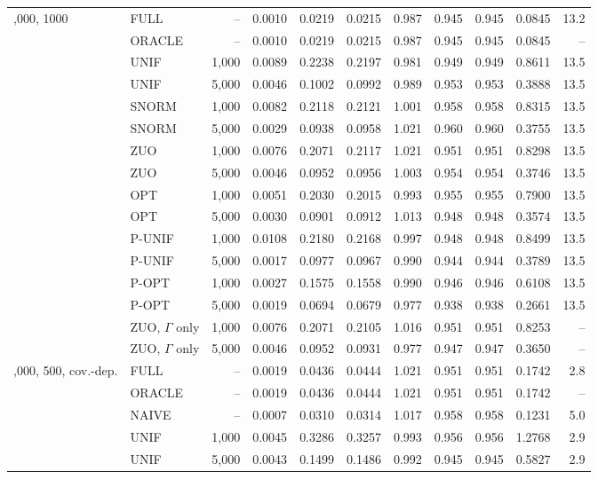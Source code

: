 \begin{tabular}{llrrrrrrrrr}
\addlinespace
200,000, 1000 & FULL & -- & 0.0010 & 0.0219 & 0.0215 & 0.987 & 0.945 & 0.945 & 0.0845 & 13.2\\
 & ORACLE & -- & 0.0010 & 0.0219 & 0.0215 & 0.987 & 0.945 & 0.945 & 0.0845 & --\\
 & UNIF & 1,000 & 0.0089 & 0.2238 & 0.2197 & 0.981 & 0.949 & 0.949 & 0.8611 & 13.5\\
 & UNIF & 5,000 & 0.0046 & 0.1002 & 0.0992 & 0.989 & 0.953 & 0.953 & 0.3888 & 13.5\\
 & SNORM & 1,000 & 0.0082 & 0.2118 & 0.2121 & 1.001 & 0.958 & 0.958 & 0.8315 & 13.5\\
 & SNORM & 5,000 & 0.0029 & 0.0938 & 0.0958 & 1.021 & 0.960 & 0.960 & 0.3755 & 13.5\\
 & ZUO & 1,000 & 0.0076 & 0.2071 & 0.2117 & 1.021 & 0.951 & 0.951 & 0.8298 & 13.5\\
 & ZUO & 5,000 & 0.0046 & 0.0952 & 0.0956 & 1.003 & 0.954 & 0.954 & 0.3746 & 13.5\\
 & OPT & 1,000 & 0.0051 & 0.2030 & 0.2015 & 0.993 & 0.955 & 0.955 & 0.7900 & 13.5\\
 & OPT & 5,000 & 0.0030 & 0.0901 & 0.0912 & 1.013 & 0.948 & 0.948 & 0.3574 & 13.5\\
 & P-UNIF & 1,000 & 0.0108 & 0.2180 & 0.2168 & 0.997 & 0.948 & 0.948 & 0.8499 & 13.5\\
 & P-UNIF & 5,000 & 0.0017 & 0.0977 & 0.0967 & 0.990 & 0.944 & 0.944 & 0.3789 & 13.5\\
 & P-OPT & 1,000 & 0.0027 & 0.1575 & 0.1558 & 0.990 & 0.946 & 0.946 & 0.6108 & 13.5\\
 & P-OPT & 5,000 & 0.0019 & 0.0694 & 0.0679 & 0.977 & 0.938 & 0.938 & 0.2661 & 13.5\\
 & ZUO, \(\Gamma\) only & 1,000 & 0.0076 & 0.2071 & 0.2105 & 1.016 & 0.951 & 0.951 & 0.8253 & --\\
 & ZUO, \(\Gamma\) only & 5,000 & 0.0046 & 0.0952 & 0.0931 & 0.977 & 0.947 & 0.947 & 0.3650 & --\\
\addlinespace
100,000, 500, cov.-dep. & FULL & -- & 0.0019 & 0.0436 & 0.0444 & 1.021 & 0.951 & 0.951 & 0.1742 & 2.8\\
 & ORACLE & -- & 0.0019 & 0.0436 & 0.0444 & 1.021 & 0.951 & 0.951 & 0.1742 & --\\
 & NAIVE & -- & 0.0007 & 0.0310 & 0.0314 & 1.017 & 0.958 & 0.958 & 0.1231 & 5.0\\
 & UNIF & 1,000 & 0.0045 & 0.3286 & 0.3257 & 0.993 & 0.956 & 0.956 & 1.2768 & 2.9\\
 & UNIF & 5,000 & 0.0043 & 0.1499 & 0.1486 & 0.992 & 0.945 & 0.945 & 0.5827 & 2.9\\

\end{tabular}
